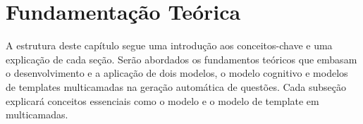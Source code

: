 \chapter{Fundamentação Teórica}\label{cap:fundamentacao-teorica}

A estrutura deste capítulo segue uma introdução aos conceitos-chave e uma explicação de cada seção. Serão abordados os fundamentos teóricos que embasam o desenvolvimento e a aplicação de dois modelos, o modelo cognitivo e modelos de templates multicamadas na geração automática de questões. Cada subseção explicará conceitos essenciais como o modelo e o modelo de template em multicamadas.   